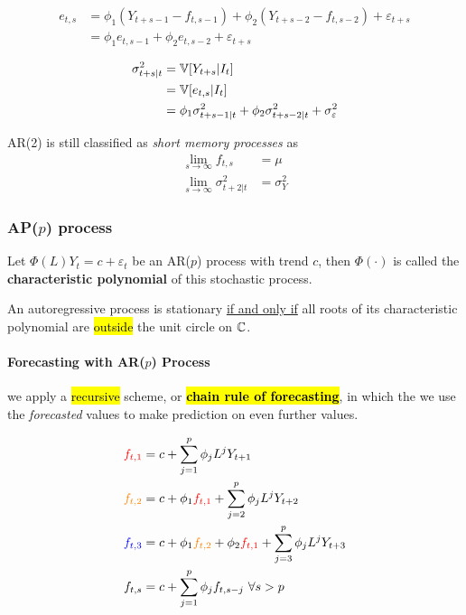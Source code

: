 \documentclass[11pt]{article}
\begin{document}
				\begin{align}
					e_{t, s} &= \phi_1(Y_{t+s-1} - f_{t, s-1}) + \phi_2(Y_{t+s-2} - f_{t, s-2}) + \varepsilon_{t+s} \\
					&= \phi_1 e_{t, s-1} + \phi_2 e_{t, s-2} + \varepsilon_{t+s}
				\end{align}
				
				\begin{align}
					\sigma_{t+s|t}^2 &= \mathbb{V}[{Y_{t+s}|I_t}] \\
					&= \mathbb{V}[{e_{t,s}|I_t}] \\
					&= \phi_1 \sigma_{t+s-1|t}^2 + \phi_2 \sigma_{t+s-2|t}^2 + \sigma_\varepsilon^2
				\end{align}
			\begin{remark}
				AR(2) is still classified as \emph{short memory processes} as 
				\begin{align}
					\lim_{s \to \infty} f_{t, s} &= \mu \\
					\lim_{s \to \infty} \sigma_{t+2|t}^2 &= \sigma_Y^2
				\end{align}
			\end{remark}
			
		\subsubsection{AP($p$) process}
			\begin{definition}
				Let $\Phi(L)Y_t = c + \varepsilon_t$ be an AR($p$) process with trend $c$, then $\Phi(\cdot)$ is called the \textbf{characteristic polynomial} of this stochastic process.
			\end{definition}
			
			\begin{theorem}
				An autoregressive process is stationary \ul{if and only if} all roots of its characteristic polynomial are \hl{outside} the unit circle on $\mathbb{C}$.
			\end{theorem}
			
			\paragraph{Forecasting with AR($p$) Process} we apply a \hl{recursive} scheme, or \hl{\textbf{chain rule of forecasting}}, in which the we use the \emph{forecasted} values to make prediction on even further values.
			\begin{example}
				\begin{align}
					\red{f_{t,1}} &= c + \sum_{j=1}^p \phi_j L^j Y_{t+1} \\
					\orange{f_{t,2}} &= c + \phi_1 \red{f_{t,1}} + \sum_{j=2}^p \phi_j L^j Y_{t+2} \\
					\blue{f_{t,3}} &= c + \phi_1 \orange{f_{t,2}} + \phi_2 \red{f_{t,1}} + \sum_{j=3}^p \phi_j L^j Y_{t+3}\\
					f_{t, s} &= c + \sum_{j=1}^p \phi_j f_{t, s-j}\ \forall s > p
				\end{align}
			\end{example}
		
\end{document}
